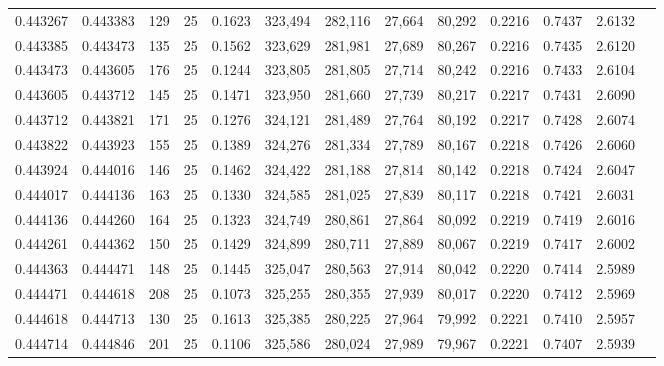 \begin{tabular}{rrrrrrrrrrrrr}
0.443267 & 0.443383 &   129 &  25 &                                     0.1623 & 323,494 & 282,116 &  27,664 &  80,292 & 0.2216 & 0.7437 & 2.6132 \\
0.443385 & 0.443473 &   135 &  25 &                                     0.1562 & 323,629 & 281,981 &  27,689 &  80,267 & 0.2216 & 0.7435 & 2.6120 \\
0.443473 & 0.443605 &   176 &  25 &                                     0.1244 & 323,805 & 281,805 &  27,714 &  80,242 & 0.2216 & 0.7433 & 2.6104 \\
0.443605 & 0.443712 &   145 &  25 &                                     0.1471 & 323,950 & 281,660 &  27,739 &  80,217 & 0.2217 & 0.7431 & 2.6090 \\
0.443712 & 0.443821 &   171 &  25 &                                     0.1276 & 324,121 & 281,489 &  27,764 &  80,192 & 0.2217 & 0.7428 & 2.6074 \\
0.443822 & 0.443923 &   155 &  25 &                                     0.1389 & 324,276 & 281,334 &  27,789 &  80,167 & 0.2218 & 0.7426 & 2.6060 \\
0.443924 & 0.444016 &   146 &  25 &                                     0.1462 & 324,422 & 281,188 &  27,814 &  80,142 & 0.2218 & 0.7424 & 2.6047 \\
0.444017 & 0.444136 &   163 &  25 &                                     0.1330 & 324,585 & 281,025 &  27,839 &  80,117 & 0.2218 & 0.7421 & 2.6031 \\
0.444136 & 0.444260 &   164 &  25 &                                     0.1323 & 324,749 & 280,861 &  27,864 &  80,092 & 0.2219 & 0.7419 & 2.6016 \\
0.444261 & 0.444362 &   150 &  25 &                                     0.1429 & 324,899 & 280,711 &  27,889 &  80,067 & 0.2219 & 0.7417 & 2.6002 \\
0.444363 & 0.444471 &   148 &  25 &                                     0.1445 & 325,047 & 280,563 &  27,914 &  80,042 & 0.2220 & 0.7414 & 2.5989 \\
0.444471 & 0.444618 &   208 &  25 &                                     0.1073 & 325,255 & 280,355 &  27,939 &  80,017 & 0.2220 & 0.7412 & 2.5969 \\
0.444618 & 0.444713 &   130 &  25 &                                     0.1613 & 325,385 & 280,225 &  27,964 &  79,992 & 0.2221 & 0.7410 & 2.5957 \\
0.444714 & 0.444846 &   201 &  25 &                                     0.1106 & 325,586 & 280,024 &  27,989 &  79,967 & 0.2221 & 0.7407 & 2.5939 \\

\end{tabular}
